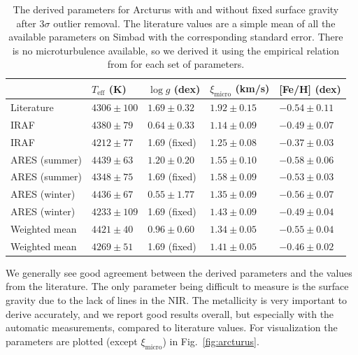 \documentclass{aa}
\begin{document}
\begin{table}[htb!]
    \caption{The derived parameters for Arcturus with and without fixed surface
             gravity after 3$\sigma$ outlier removal. The literature values are
             a simple mean of all the available parameters on Simbad with the
             corresponding standard error. There is no microturbulence
             available, so we derived it using the empirical relation
             from \citet{Adibekyan2015} for each set of parameters.}
    \label{tab:arcturus}
    \centering
    \begin{tabular}{lllll}
      \hline\hline
                      & $T_\mathrm{eff}$ (K) &  $\log g$ (dex)  &   $\xi_\mathrm{micro}$ (km/s)   & [Fe/H] (dex)     \\
      \hline
        Literature    & $4306 \pm 100$       &  $1.69 \pm 0.32$ &    $1.92 \pm 0.15$              & $-0.54 \pm 0.11$ \\
      \hline
        IRAF          & $4380 \pm  79$       &  $0.64 \pm 0.33$ &    $1.14 \pm 0.09$              & $-0.49 \pm 0.07$ \\
        IRAF          & $4212 \pm  77$       &   1.69 (fixed)   &    $1.25 \pm 0.08$              & $-0.37 \pm 0.03$ \\
      \hline
        ARES (summer) & $4439 \pm  63$       &  $1.20 \pm 0.20$ &    $1.55 \pm 0.10$              & $-0.58 \pm 0.06$ \\
        ARES (summer) & $4348 \pm  75$       &   1.69 (fixed)   &    $1.58 \pm 0.09$              & $-0.53 \pm 0.03$ \\
        ARES (winter) & $4436 \pm  67$       &  $0.55 \pm 1.77$ &    $1.35 \pm 0.09$              & $-0.56 \pm 0.07$ \\
        ARES (winter) & $4233 \pm 109$       &   1.69 (fixed)   &    $1.43 \pm 0.09$              & $-0.49 \pm 0.04$ \\
      \hline
        Weighted mean & $4421 \pm  40$       &  $0.96 \pm 0.60$ &    $1.34 \pm 0.05$              & $-0.55 \pm 0.04$ \\
        Weighted mean & $4269 \pm  51$       &   1.69 (fixed)   &    $1.41 \pm 0.05$              & $-0.46 \pm 0.02$ \\
      \hline
    \end{tabular}
\end{table}

We generally see good agreement between the derived parameters and the values
from the literature. The only parameter being difficult to measure is the
surface gravity due to the lack of  lines in the NIR. The
metallicity is very important to derive accurately, and we report good results
overall, but especially with the automatic measurements, compared to literature
values. For visualization the parameters are plotted (except
$\xi_\mathrm{micro}$) in Fig.~\ref{fig:arcturus}.
\end{document}
